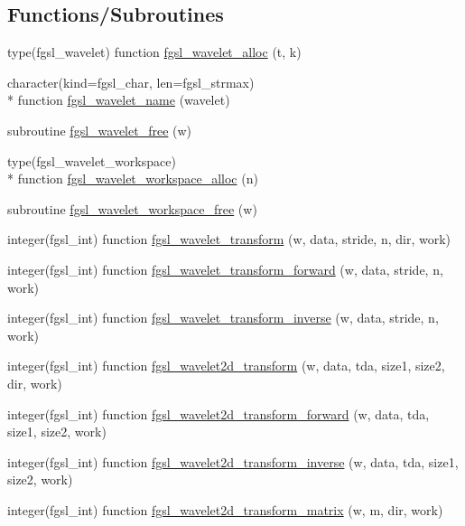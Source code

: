 \subsection*{Functions/\-Subroutines}
\begin{DoxyCompactItemize}
\item 
type(fgsl\-\_\-wavelet) function \hyperlink{wavelet_8finc_a0534f5b9d5db58fc98d3996bf7eefc20}{fgsl\-\_\-wavelet\-\_\-alloc} (t, k)
\item 
character(kind=fgsl\-\_\-char, len=fgsl\-\_\-strmax) \\*
function \hyperlink{wavelet_8finc_a2ff5880cd29c1fa264f815fda096f4ab}{fgsl\-\_\-wavelet\-\_\-name} (wavelet)
\item 
subroutine \hyperlink{wavelet_8finc_af843924a1fcec19d66e6c2aa89b6fb71}{fgsl\-\_\-wavelet\-\_\-free} (w)
\item 
type(fgsl\-\_\-wavelet\-\_\-workspace) \\*
function \hyperlink{wavelet_8finc_aa120476a77ed63c701cb8cf8fc575409}{fgsl\-\_\-wavelet\-\_\-workspace\-\_\-alloc} (n)
\item 
subroutine \hyperlink{wavelet_8finc_a8877c7b5815c334ab195f6517273a91e}{fgsl\-\_\-wavelet\-\_\-workspace\-\_\-free} (w)
\item 
integer(fgsl\-\_\-int) function \hyperlink{wavelet_8finc_a3dd1ffd5ce0dd32861b9221f6afae511}{fgsl\-\_\-wavelet\-\_\-transform} (w, data, stride, n, dir, work)
\item 
integer(fgsl\-\_\-int) function \hyperlink{wavelet_8finc_a70c8c242811e478cebb88eb3b27788ab}{fgsl\-\_\-wavelet\-\_\-transform\-\_\-forward} (w, data, stride, n, work)
\item 
integer(fgsl\-\_\-int) function \hyperlink{wavelet_8finc_a34094547d54cf81dc906fff09ceb1a44}{fgsl\-\_\-wavelet\-\_\-transform\-\_\-inverse} (w, data, stride, n, work)
\item 
integer(fgsl\-\_\-int) function \hyperlink{wavelet_8finc_ae721627d9553cf0c2d1396e45d1fb146}{fgsl\-\_\-wavelet2d\-\_\-transform} (w, data, tda, size1, size2, dir, work)
\item 
integer(fgsl\-\_\-int) function \hyperlink{wavelet_8finc_a0ae200617e842d153159591b59cc56b5}{fgsl\-\_\-wavelet2d\-\_\-transform\-\_\-forward} (w, data, tda, size1, size2, work)
\item 
integer(fgsl\-\_\-int) function \hyperlink{wavelet_8finc_a05d7bb6ada598550a9df3b0a0cdfdb05}{fgsl\-\_\-wavelet2d\-\_\-transform\-\_\-inverse} (w, data, tda, size1, size2, work)
\item 
integer(fgsl\-\_\-int) function \hyperlink{wavelet_8finc_abbe205405ba63a585d68d1e3f5db5903}{fgsl\-\_\-wavelet2d\-\_\-transform\-\_\-matrix} (w, m, dir, work)

\end{DoxyCompactItemize}
